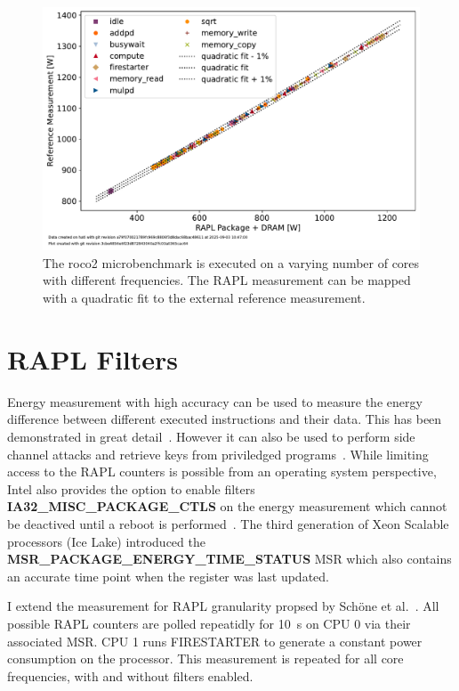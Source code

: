 \begin{figure}[]
    \centering
    \includegraphics[width=0.8\columnwidth]{fig/rapl-accuracy/rapl-accuracy.pdf}
    \caption{\label{fig:validate-rapl}The roco2 microbenchmark is executed on a varying number of cores with different frequencies.
    The RAPL measurement can be mapped with a quadratic fit to the external reference measurement.}
\end{figure}

\section{RAPL Filters}

Energy measurement with high accuracy can be used to measure the energy difference between different executed instructions and their data.
This has been demonstrated in great detail~\cite{Lucas_2016_AluPower,Schoene_2024_Alder_Lake,Schoene_2021_Zen2}.
However it can also be used to perform side channel attacks and retrieve keys from priviledged programs~\cite{Lipp_2021_Platypus}.
While limiting access to the RAPL counters is possible from an operating system perspective, Intel also provides the option to enable filters \textbf{IA32\_MISC\_PACKAGE\_CTLS} on the energy measurement which cannot be deactived until a reboot is performed~\cite[Vol. 4 Table 2-52]{intel_combined_software_developer_manual}.
The third generation of Xeon Scalable processors (Ice Lake) introduced the \textbf{MSR\_PACKAGE\_ENERGY\_TIME\_STATUS} MSR which also contains an accurate time point when the register was last updated.

I extend the measurement for RAPL granularity propsed by Schöne et al.~\cite{Schoene_2024_Alder_Lake}.
All possible RAPL counters are polled repeatidly for \SI{10}{\s} on CPU 0 via their associated MSR.
CPU 1 runs FIRESTARTER to generate a constant power consumption on the processor.
This measurement is repeated for all core frequencies, with and without filters enabled.

